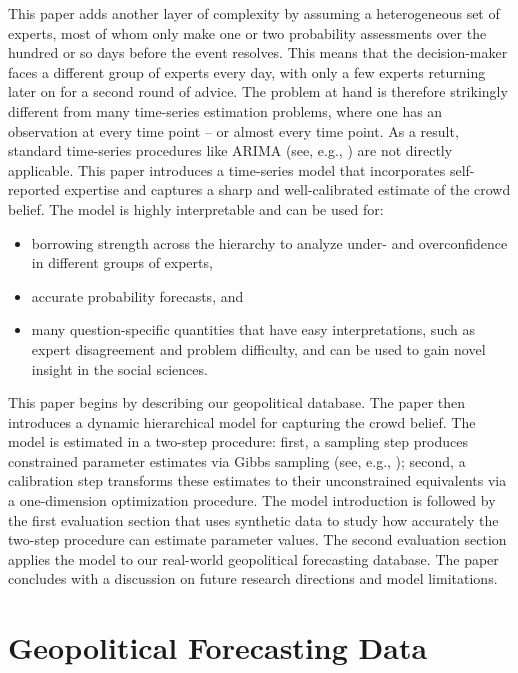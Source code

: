 \documentclass[aoas, preprint]{imsart}
\numberwithin{equation}{section}
\theoremstyle{plain}
\begin{document}
This paper adds another layer of complexity by assuming a heterogeneous set of experts, most of whom only make one or two probability assessments over the hundred or so days before the event resolves. This means that the decision-maker faces a different group of experts  every day, with only a few experts returning later on for a second round of advice. The problem at hand is therefore strikingly different from many time-series estimation problems, where one has an observation at every time point -- or almost every time point. As a result, standard time-series procedures like ARIMA (see, e.g., \citet{mills1991time}) are not directly applicable. This paper introduces a time-series model that incorporates self-reported expertise and captures a sharp and well-calibrated estimate of the crowd belief. The model is highly interpretable and can be used for:
\begin{itemize}
\item borrowing strength across the hierarchy to analyze under- and overconfidence in different groups of experts,
\item accurate probability forecasts, and
\item many question-specific quantities that have easy interpretations, such as expert disagreement and problem difficulty, and can be used to gain novel insight in the social sciences. 
\end{itemize}

This paper begins by describing our geopolitical database. The paper then introduces a dynamic hierarchical model for capturing the crowd belief. The model is estimated in a two-step procedure: first, a sampling step produces constrained parameter estimates via Gibbs sampling (see, e.g., \citet{geman1984stochastic}); second, a calibration step transforms these estimates to their unconstrained equivalents via a one-dimension optimization procedure. The model introduction is followed by the first evaluation section that uses synthetic data to study how accurately the two-step procedure can estimate parameter values. The second evaluation section applies the model to our real-world geopolitical forecasting database. The paper concludes with a discussion on future research directions and model limitations.

\section{Geopolitical Forecasting Data}
\label{data}
\end{document}
